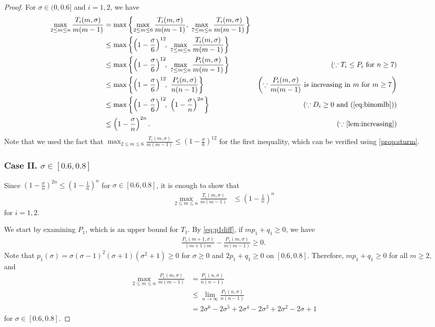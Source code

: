 \documentclass{article}
\theoremstyle{plain}
\theoremstyle{definition}
\theoremstyle{remark}
\def\bigopen#1{\left(#1\right)}
\def\bigset#1{\left\{#1\right\}}
\begin{document}
\begin{proof}
For $\sigma\in (0, 0.6]$ and $i=1,2$, we have 
\begin{align*}
    \max_{2\le m\le n} \frac{T_i(m, \sigma)}{m(m-1)} &= \max \bigset{\max_{2\le m\le 6} \frac{T_i(m, \sigma)}{m(m-1)},~\max_{7\le m\le n} \frac{T_i(m, \sigma)}{m(m-1)}} \\
    &\le \max \bigset{\bigopen{1-\frac{\sigma}{6}}^{12} \!\!,~\max_{7\le m\le n} \frac{T_i(m, \sigma)}{m(m-1)}} \\
    &\le \max \bigset{\bigopen{1-\frac{\sigma}{6}}^{12} \!\!,~\max_{7\le m\le n} \frac{P_i(m, \sigma)}{m(m-1)}} &(\because T_i\le P_i \text{ for } n\ge 7)\\
    &\le \max \bigset{\bigopen{1-\frac{\sigma}{6}}^{12} \!\!,~\frac{P_i(n, \sigma)}{n(n-1)}} &\bigopen{\because \frac{P_i(m,\sigma)}{m(m-1)} \text{ is increasing in } m \text{ for } m\ge 7}\\
    &\le \max \bigset{\bigopen{1-\frac{\sigma}{6}}^{12} \!\!,~\bigopen{1-\frac{\sigma}{n}}^{2n}} &(\because D_i \ge 0 \text{ and } (\ref{eq:binomlb}))\\
    &\le \bigopen{1-\frac{\sigma}{n}}^{2n}. &(\because \text{\cref{lem:increasing}})\\
\end{align*}
Note that we used the fact that $\max_{2\le m\le 6}\frac{T_i(m, \sigma)}{m(m-1)} \le \bigopen{1-\frac{\sigma}{6}}^{12}$ for the first inequality, which can be verified using \cref{prop:sturm}.

\subsubsection*{Case II. $\sigma \in [0.6, 0.8]$}

Since $\bigopen{1-\frac{\sigma}{n}}^{2n} \le \bigopen{1-\frac{1}{n}}^n$ for $\sigma\in [0.6, 0.8]$, it is enough to show that 
\begin{align*}
    \max_{2\le m\le n} \frac{T_i(m, \sigma)}{m(m-1)}  &\le \bigopen{1-\frac{1}{n}}^n
\end{align*}
for $i=1,2$.

We start by examining $P_1$, which is an upper bound for $T_1$. By \cref{eq:p1diff}, if $mp_1+q_1\ge 0$, we have 
\begin{align*}
    \frac{P_1(m+1, \sigma)}{(m+1)m} - \frac{P_1(m, \sigma)}{m(m-1)} \ge 0.
\end{align*}
Note that $p_1(\sigma) = \sigma(\sigma-1)^2 (\sigma+1)(\sigma^2+1)\ge 0$ for $\sigma \ge 0$ and $2p_1+q_1\ge 0$ on $[0.6, 0.8]$. Therefore, $mp_1+q_1 \ge 0$ for all $m\ge 2$, and
\begin{align*}
    \max_{2 \le m \le n} \frac{P_1(m, \sigma)}{m(m-1)} &= \frac{P_1(n, \sigma)}{n(n-1)} \\
    &\le \lim_{n\to \infty} \frac{P_1(n, \sigma)}{n(n-1)} \\
    &= 2 \sigma^6 - 2 \sigma^5 + 2 \sigma^4 - 2 \sigma^3 + 2 \sigma^2 - 2 \sigma + 1
\end{align*}
for $\sigma\in [0.6, 0.8]$.


\end{proof}
\end{document}
